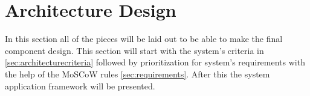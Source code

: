 \section{Architecture Design} \label{sec:architecturedesign}
In this section all of the pieces will be laid out to be able to make the final component design.
This section will start with the system's criteria in \cref{sec:architecturecriteria} followed by prioritization for system's requirements with the help of the MoSCoW rules \cref{sec:requirements}.
After this the system application framework will be presented.



%

